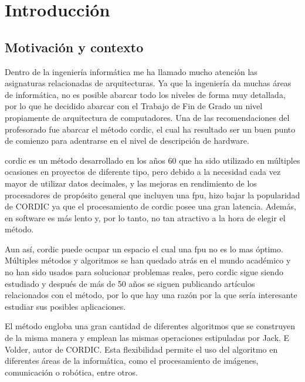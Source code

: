 
\chapter{Introducción}
\section{Motivación y contexto}
\label{motivacion}

Dentro de la ingeniería informática me ha llamado mucho atención las asignaturas relacionadas de arquitecturas. Ya que la ingeniería da muchas áreas de informática, no es posible abarcar todo los niveles de forma muy detallada, por lo que he decidido abarcar con el Trabajo de Fin de Grado un nivel propiamente de arquitectura de computadores. Una de las recomendaciones del profesorado fue abarcar el método \gls{cordic}, el cual ha resultado ser un buen punto de comienzo para adentrarse en el nivel de descripción de hardware.

\gls{cordic} es un método desarrollado en los años 60 que ha sido utilizado en múltiples ocasiones en proyectos de diferente tipo, pero debido a la necesidad cada vez mayor de utilizar datos decimales, y las mejoras en rendimiento de los procesadores de propósito general que incluyen una \gls{fpu}, hizo bajar la popularidad de CORDIC ya que el procesamiento de \gls{cordic} posee una gran latencia. Además, en software es más lento y, por lo tanto, no tan atractivo a la hora de elegir el método.

Aun así, \gls{cordic} puede ocupar un espacio el cual una \gls{fpu} no es lo mas óptimo. Múltiples métodos y algoritmos se han quedado atrás en el mundo académico y no han sido usados para solucionar problemas reales, pero \gls{cordic} sigue siendo estudiado y después de más de 50 años se siguen publicando artículos relacionados con el método, por lo que hay una razón por la que sería interesante estudiar sus posibles aplicaciones.

El método engloba una gran cantidad de diferentes algoritmos que se construyen de la misma manera y emplean las mismas operaciones estipuladas por Jack. E Volder, autor de CORDIC. Esta flexibilidad permite el uso del algoritmo en diferentes áreas de la informática, como el procesamiento de imágenes, comunicación o robótica, entre otros.

